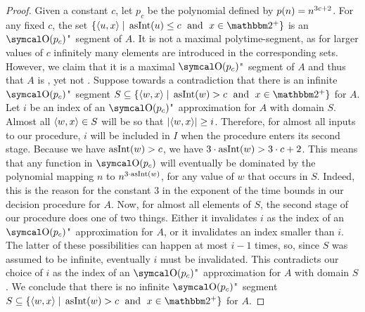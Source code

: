 \begin{proof}
  Given a constant $c$, let $p_c$ be the polynomial defined by $p(n) = n^{3c + 2}$.
  For any fixed $c$, the set $\{\pair{u}{x} \st \asNat(u) \le c \reland x \in \binary^+\}$ is an $\bigO(p_c)$"~segment of $A$.
  It is not a maximal polytime-segment, as for larger values of $c$ infinitely many elements are introduced in the corresponding sets.
  However, we claim that it is a maximal $\bigO(p_c)$"~segment of $A$ and thus that $A$ is , yet not .
  Suppose towards a contradiction that there is an infinite $\bigO(p_c)$"~segment $S \subseteq \{\pair{w}{x} \st \asNat(w) > c \reland x \in \binary^+\}$ for $A$.
  Let $i$ be an index of an $\bigO(p_c)$"~approximation for $A$ with domain $S$.
  Almost all ${\langle w, x\rangle} \in S$ will be so that ${\lvert{\langle w, x\rangle}\rvert} \ge i$.
  Therefore, for almost all inputs to our procedure, $i$ will be included in $I$ when the procedure enters its second stage.
  Because we have $\operatorname{asInt}(w) > c$, we have $3 \cdot \operatorname{asInt}(w) > 3 \cdot c + 2$.
  This means that any function in $\bigO(p_c)$ will eventually be dominated by the polynomial mapping $n$ to $n^{3 \cdot \operatorname{asInt}(w)}$, for any value of $w$ that occurs in $S$.
  Indeed, this is the reason for the constant $3$ in the exponent of the time bounds in our decision procedure for $A$.
  Now, for almost all elements of $S$, the second stage of our procedure does one of two things.
  Either it invalidates $i$ as the index of an $\bigO(p_c)$"~approximation for $A$, or it invalidates an index smaller than $i$.
  The latter of these possibilities can happen at most $i - 1$ times, so, since $S$ was assumed to be infinite, eventually $i$ must be invalidated.
  This contradicts our choice of $i$ as the index of an $\bigO(p_c)$"~approximation for $A$ with domain $S$.
  We conclude that there is no infinite $\bigO(p_c)$"~segment $S \subseteq \{\pair{w}{x} \st \asNat(w) > c \reland x \in \binary^+\}$ for $A$.
\end{proof}
%

